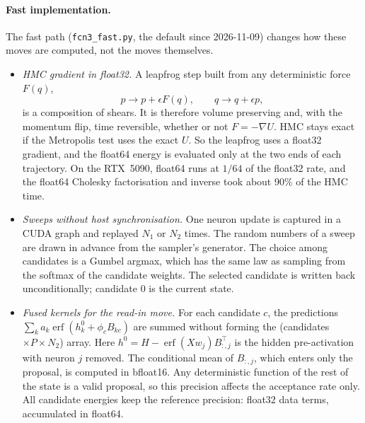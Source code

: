 \documentclass[11pt,a4paper]{article}
\newcommand{\erf}{\operatorname{erf}}
\begin{document}
\paragraph{Fast implementation.}
The fast path (\texttt{fcn3\_fast.py}, the default since 2026-11-09) changes how these moves are computed, not the moves themselves.
\begin{itemize}
  \item \emph{HMC gradient in float32.} A leapfrog step built from any deterministic force $F(q)$,
    \[p\to p+\epsilon F(q),\qquad q\to q+\epsilon p,\]
    is a composition of shears. It is therefore volume preserving and, with the momentum flip, time reversible, whether or not $F=-\nabla U$.
    HMC stays exact if the Metropolis test uses the exact $U$.
    So the leapfrog uses a float32 gradient, and the float64 energy is evaluated only at the two ends of each trajectory.
    On the RTX~5090, float64 runs at $1/64$ of the float32 rate, and the float64 Cholesky factorisation and inverse took about 90\% of the HMC time.
  \item \emph{Sweeps without host synchronisation.}
    One neuron update is captured in a CUDA graph and replayed $N_1$ or $N_2$ times.
    The random numbers of a sweep are drawn in advance from the sampler's generator.
    The choice among candidates is a Gumbel argmax, which has the same law as sampling from the softmax of the candidate weights.
    The selected candidate is written back unconditionally; candidate 0 is the current state.
  \item \emph{Fused kernels for the read-in move.}
    For each candidate $c$, the predictions $\sum_k a_k\erf(h^0_k+\phi_c B_{kc})$ are summed without forming the
    (candidates $\times P\times N_2$) array. Here $h^0=H-\erf(Xw_j)B_{:,j}^\top$ is the hidden pre-activation with neuron $j$ removed.
    The conditional mean of $B_{:,j}$, which enters only the proposal, is computed in bfloat16.
    Any deterministic function of the rest of the state is a valid proposal, so this precision affects the acceptance rate only.
    All candidate energies keep the reference precision: float32 data terms, accumulated in float64.
\end{itemize}
\end{document}
